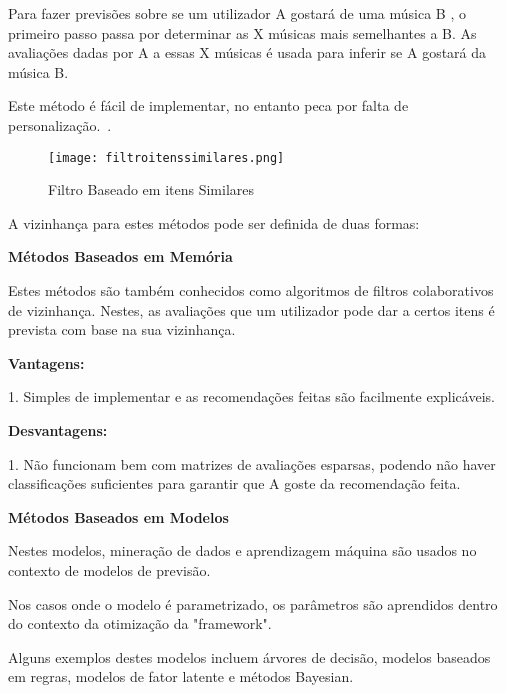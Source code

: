\hfill

 \par Para fazer previsões sobre se um utilizador A gostará de uma música B , o primeiro passo passa por determinar as X músicas mais semelhantes a B. As avaliações dadas por A a essas X músicas é usada para inferir se A gostará da música B.

 \par Este método é fácil de implementar, no entanto peca por falta de personalização.~\cite{ref_article1}.\newline

\begin{figure}[H]

  \centering

  \texttt{[image: filtroitenssimilares.png]}

  \caption{Filtro Baseado em itens Similares}

  \label{fig02}

\end{figure}
\par A vizinhança para estes métodos pode ser definida de duas formas:



\begin{center}
\normalsize{\bfseries Métodos Baseados em Memória}\hfill
\end{center}

 \par Estes métodos são também conhecidos como algoritmos de filtros colaborativos de vizinhança. Nestes, as avaliações que um utilizador pode dar a certos itens é prevista com base na sua vizinhança.\newline

\textbf{Vantagens:}\hfill
\hfill
\par 1. Simples de implementar e as recomendações feitas são facilmente explicáveis.\newline

\textbf{Desvantagens:}\hfill
\hfill
\par 1. Não funcionam bem com matrizes de avaliações esparsas, podendo não haver classificações suficientes para garantir que A goste da recomendação feita.\newline

\begin{center}
\normalsize{\bfseries Métodos Baseados em Modelos}\hfill
\end{center}
\hfill
\par Nestes modelos, mineração de dados e aprendizagem máquina são usados no contexto de modelos de previsão.
\par Nos casos onde o modelo é parametrizado, os parâmetros são aprendidos dentro do contexto da otimização da "framework".
\par Alguns exemplos destes modelos incluem árvores de decisão, modelos baseados em regras, modelos de fator latente e métodos Bayesian.




